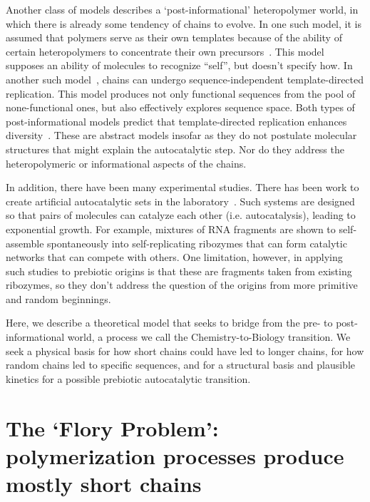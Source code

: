 \documentclass[5p,times]{elsarticle}
\begin{document}
 Another class of models describes a `post-informational' heteropolymer world, in which there is 
already some tendency of chains to evolve.  In one such model, it is assumed that polymers serve as 
their own templates because of the ability of certain heteropolymers to concentrate their own 
precursors~\cite{nowak2008prevolutionary,Ohtsuki2009,Chen2012,Derr2012}.  This model supposes an 
ability of molecules to recognize ``self'', but doesn't specify how.  In another such 
model~\cite{Walker2012}, chains can undergo sequence-independent template-directed replication.  
This model produces not only functional sequences from the pool of none-functional ones, but also 
effectively explores sequence space.  Both types of post-informational models predict that 
template-directed replication enhances diversity~\cite{Derr2012}.   These are abstract
models insofar as they do not postulate molecular structures that might explain the autocatalytic 
step. Nor do they address the heteropolymeric or informational aspects of the chains.
 
 In addition, there have been many experimental studies.  There has been work to create artificial 
autocatalytic sets in the laboratory~\cite{VonKiedrowski1986,Lincoln2009,Vaidya2012}. Such systems 
are designed so that pairs of molecules can catalyze each other (i.e. autocatalysis), leading to 
exponential growth.  For example, mixtures of RNA fragments are shown to self-assemble spontaneously 
into self-replicating ribozymes that can form catalytic networks that can compete with others.  One 
limitation, however, in applying such studies to prebiotic origins is that these are fragments taken 
from existing ribozymes, so they don't address the question of the origins from more primitive and 
random beginnings.
 
  Here, we describe a theoretical model that seeks to bridge from the pre- to post-informational 
world, a process we call the Chemistry-to-Biology transition.  We seek a physical basis for how 
short chains could have led to longer chains, for how random chains led to specific sequences, and 
for a structural basis and plausible kinetics for a possible prebiotic autocatalytic transition.
   
 \section{The `Flory Problem': polymerization processes produce mostly short chains}
 \label{sec:flory} 
\end{document}
